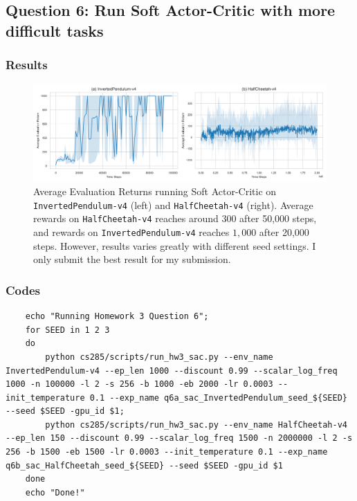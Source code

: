 \documentclass[10pt, letterpaper]{article}
\begin{document}
\subsection*{Question 6: Run Soft Actor-Critic with more difficult tasks}
\subsubsection*{Results}
\begin{figure}[thbp]
    \centering 
    \includegraphics[width=\textwidth]{img/q6.png}
    \caption{Average Evaluation Returns running Soft Actor-Critic on \texttt{InvertedPendulum-v4} (left) and \texttt{HalfCheetah-v4} (right). Average rewards on \texttt{HalfCheetah-v4} reaches around $300$ after 50,000 steps, and rewards on \texttt{InvertedPendulum-v4} reaches $1,000$ after 20,000 steps. However, results varies greatly with different seed settings. I only submit the best result for my submission.}
    \label{fig:6}
\end{figure}
\subsubsection*{Codes}
\begin{lstlisting}
    echo "Running Homework 3 Question 6";
    for SEED in 1 2 3
    do
        python cs285/scripts/run_hw3_sac.py --env_name InvertedPendulum-v4 --ep_len 1000 --discount 0.99 --scalar_log_freq 1000 -n 100000 -l 2 -s 256 -b 1000 -eb 2000 -lr 0.0003 --init_temperature 0.1 --exp_name q6a_sac_InvertedPendulum_seed_${SEED} --seed $SEED -gpu_id $1;
        python cs285/scripts/run_hw3_sac.py --env_name HalfCheetah-v4 --ep_len 150 --discount 0.99 --scalar_log_freq 1500 -n 2000000 -l 2 -s 256 -b 1500 -eb 1500 -lr 0.0003 --init_temperature 0.1 --exp_name q6b_sac_HalfCheetah_seed_${SEED} --seed $SEED -gpu_id $1
    done
    echo "Done!"
\end{lstlisting}
\end{document}
